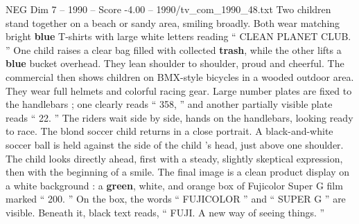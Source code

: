 \begin{textsample}{NEG Dim 7 – 1990 – Score -4.00 – 1990/tv\_com\_1990\_48.txt}
Two children stand together on a beach or sandy area, smiling broadly.
Both wear matching bright \textbf{blue} T-shirts with large white letters reading “ CLEAN PLANET CLUB. ” One child raises a clear bag filled with collected \textbf{trash}, while the other lifts a \textbf{blue} bucket overhead.
They lean shoulder to shoulder, proud and cheerful.
The commercial then shows children on BMX-style bicycles in a wooded outdoor area.
They wear full helmets and colorful racing gear.
Large number plates are fixed to the handlebars ; one clearly reads “ 358, ” and another partially visible plate reads “ 22. ” The riders wait side by side, hands on the handlebars, looking ready to race.
The blond soccer child returns in a close portrait.
A black-and-white soccer ball is held against the side of the child ’s head, just above one shoulder.
The child looks directly ahead, first with a steady, slightly skeptical expression, then with the beginning of a smile.
The final image is a clean product display on a white background : a \textbf{green}, white, and orange box of Fujicolor Super G film marked “ 200. ” On the box, the words “ FUJICOLOR ” and “ SUPER G ” are visible.
Beneath it, black text reads, “ FUJI.
A new way of seeing things. ”

\end{textsample}
